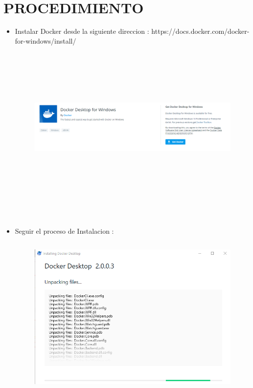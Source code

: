 \section{PROCEDIMIENTO} 

\begin{itemize}
\subsection{Instalacion de Docker}
	
	\item Instalar Docker desde la siguiente direccion :
	https://docs.docker.com/docker-for-windows/install/
	\begin{figure}[htb]
	\begin{center}
	\includegraphics[width=18cm, height=8cm]{./Imagenes/docker}
	\end{center}
	\end{figure}\\
	
	\item Seguir el proceso de Instalacion :\\
	\begin{figure}[htb]
	\begin{center}
	\includegraphics[width=18cm, height=8cm]{./Imagenes/dockerinst}
	\end{center}
	\end{figure}\\
	

\end{itemize}

